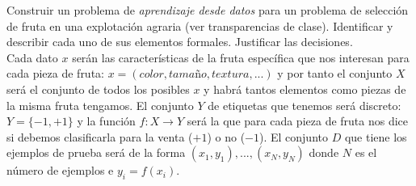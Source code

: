 \documentclass[12pt]{article}
\theoremstyle{definition}
\begin{document}
\begin{pregunta}
Construir un problema de \textit{aprendizaje desde datos} para un problema de selección de fruta en una explotación agraria (ver transparencias de clase). Identificar y describir cada uno de sus elementos formales. Justificar las decisiones.\\

Cada dato $x$ serán las características de la fruta específica que nos interesan para cada pieza de fruta: $x = (color, tamaño, textura,...)$ y por tanto el conjunto $X$ será el conjunto de todos los posibles $x$ y habrá tantos elementos como piezas de la misma fruta tengamos. El conjunto $Y$ de etiquetas que tenemos será discreto: $Y=\{-1,+1\}$ y la función $f:X \rightarrow Y$ será la que para cada pieza de fruta nos dice si debemos clasificarla para la venta ($+1$) o no ($-1$). El conjunto $D$ que tiene los ejemplos de prueba será de la forma $(x_1,y_1),...,(x_N,y_N)$ donde $N$ es el número de ejemplos e $y_i=f(x_i)$.
\end{pregunta}
\end{document}
